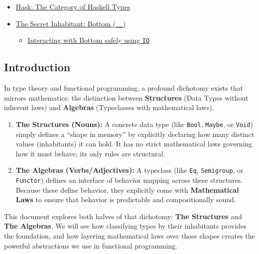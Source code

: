 \documentclass[
]{article}
\providecommand{\tightlist}{%
  \setlength{\itemsep}{0pt}\setlength{\parskip}{0pt}}
\begin{document}
\begin{itemize}
  \begin{itemize}
  \tightlist
  \item
    \hyperref[hask-the-category-of-haskell-types]{Hask: The Category of
    Haskell Types}
  \item
    \hyperref[the-secret-inhabitant-bottom-__]{The Secret Inhabitant:
    Bottom (\texttt{\_\textbar{}\_})}

    \begin{itemize}
    \tightlist
    \item
      \hyperref[interacting-with-bottom-safely-using-io]{Interacting
      with Bottom safely using \texttt{IO}}
    \end{itemize}
  \end{itemize}
\end{itemize}

\subsection{Introduction}\label{introduction}

In type theory and functional programming, a profound dichotomy exists
that mirrors mathematics: the distinction between \textbf{Structures}
(Data Types without inherent laws) and \textbf{Algebras} (Typeclasses
with mathematical laws).

\begin{enumerate}
\def\labelenumi{\arabic{enumi}.}
\tightlist
\item
  \textbf{The Structures (Nouns):} A concrete data type (like
  \texttt{Bool}, \texttt{Maybe}, or \texttt{Void}) simply defines a
  ``shape in memory'' by explicitly declaring how many distinct values
  (inhabitants) it can hold. It has no strict mathematical laws
  governing how it must behave; its only rules are structural.
\item
  \textbf{The Algebras (Verbs/Adjectives):} A typeclass (like
  \texttt{Eq}, \texttt{Semigroup}, or \texttt{Functor}) defines an
  interface of behavior mapping across these structures. Because these
  define behavior, they explicitly come with \textbf{Mathematical Laws}
  to ensure that behavior is predictable and compositionally sound.
\end{enumerate}

This document explores both halves of that dichotomy: \textbf{The
Structures} and \textbf{The Algebras}. We will see how classifying types
by their inhabitants provides the foundation, and how layering
mathematical laws over those shapes creates the powerful abstractions we
use in functional programming.
\end{document}
